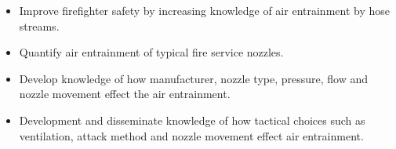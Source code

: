 \documentclass[12pt,oneside]{book}
\begin{document}
\begin{itemize}
	\item Improve firefighter safety by increasing knowledge of air entrainment by hose streams.
	\item Quantify air entrainment of typical fire service nozzles. 
	\item Develop knowledge of how manufacturer, nozzle type, pressure, flow and nozzle movement effect the air entrainment.
	\item Development and disseminate knowledge of how tactical choices such as ventilation, attack method and nozzle movement effect air entrainment. 
	\end{itemize}






\end{document}
